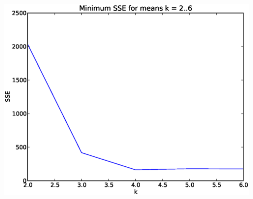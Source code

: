 \documentclass[12pt,letterpaper]{article}
\begin{document}
\begin{enumerate}
\begin{enumerate}
		\includegraphics[width=6in]{minsse.eps} \\[15mm]
	\end{enumerate} 
\end{enumerate} 
\end{document}

